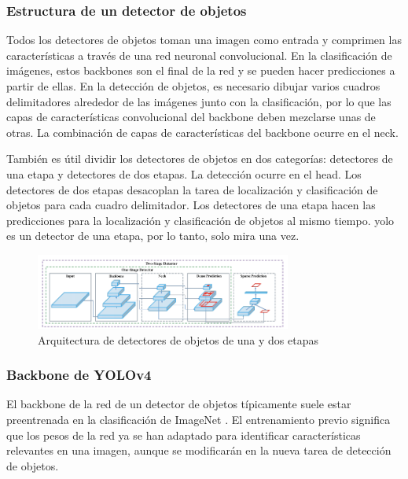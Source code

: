 \subsubsection*{Estructura de un detector de objetos}
\label{subsubsec:estructura-detector-objetos}

Todos los detectores de objetos toman una imagen como entrada y comprimen las características a través de una red neuronal convolucional. En la clasificación de imágenes, estos backbones son el final de la red y se pueden hacer predicciones a partir de ellas. En la detección de objetos, es necesario dibujar varios cuadros delimitadores alrededor de las imágenes junto con la clasificación, por lo que las capas de características convolucional del backbone deben mezclarse unas de otras. La combinación de capas de características del backbone ocurre en el neck.

También es útil dividir los detectores de objetos en dos categorías: detectores de una etapa y detectores de dos etapas. La detección ocurre en el head. Los detectores de dos etapas desacoplan la tarea de localización y clasificación de objetos para cada cuadro delimitador. Los detectores de una etapa hacen las predicciones para la localización y clasificación de objetos al mismo tiempo. \gls{yolo} es un detector de una etapa, por lo tanto, solo mira una vez.

\begin{figure}[ht]
\centering
\includegraphics[width=0.75\textwidth]{img/chapters/estado-del-arte/one-two-stage-detector.png}
\caption{\label{fig:one-two-stage-detector}Arquitectura de detectores de objetos de una y dos etapas}
\end{figure}

\subsubsection*{Backbone de YOLOv4}
\label{subsubsec:yolov4-backbone}

El backbone de la red de un detector de objetos típicamente suele estar preentrenada en la clasificación de ImageNet \cite{russakovsky2015imagenet}. El entrenamiento previo significa que los pesos de la red ya se han adaptado para identificar características relevantes en una imagen, aunque se modificarán en la nueva tarea de detección de objetos.

